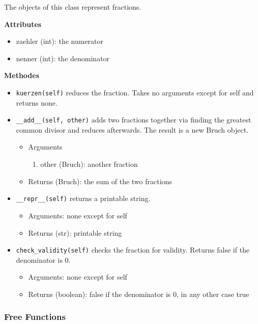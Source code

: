 \documentclass[refman]{scrartcl}
\begin{document}
The objects of this class represent fractions.

\noindent\textbf{Attributes}

\begin{itemize}
    \item zaehler (int): the numerator
    \item nenner (int): the denominator
\end{itemize}

\noindent\textbf{Methodes}

\begin{itemize}
    \item \texttt{kuerzen(self)} reduces the fraction. Takes no arguments except for self and returns none.
    \item \texttt{\_\_add\_\_(self, other)} adds two fractions together via finding the greatest common divisor and reduces afterwards. The result is a new Bruch object.
    \begin{itemize}
        \item Arguments
        \begin{enumerate}
            \item other (Bruch): another fraction
        \end{enumerate}
        \item Returns (Bruch): the sum of the two fractions
    \end{itemize}
    \item \texttt{\_\_repr\_\_(self)} returns a printable string.
    \begin{itemize}
        \item Arguments: none except for self
        \item Returns (str): printable string
    \end{itemize}
    \item \texttt{check\_validity(self)} checks the fraction for validity. Returns false if the denominator is \(0\).
    \begin{itemize}
        \item Arguments: none except for self
        \item Returns (boolean): false if the denominator is \(0\), in any other case true
    \end{itemize}
\end{itemize}

\subsubsection{Free Functions}
\end{document}
